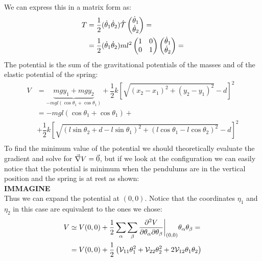 We can express this in a matrix form as:
\begin{equation}
    \begin{split}
        T &= \dfrac{1}{2}(\dot{\theta}_1 \dot{\theta}_2)\hat{\mathcal{T}}\begin{pmatrix}
            \dot{\theta}_1 \\\dot{\theta}_2
        \end{pmatrix} = \\
        &= \dfrac{1}{2}(\dot{\theta}_1 \dot{\theta}_2)ml^2\begin{pmatrix}
            1 & 0\\
            0 & 1
        \end{pmatrix}
        \begin{pmatrix}
            \dot{\theta}_1 \\\dot{\theta}_2
        \end{pmatrix} = \\
    \end{split}
\end{equation}
The potential is the sum of the gravitational potentials of the masses and of the elastic potential of the spring:
\begin{equation}
    \begin{split}
        V &= \underbrace{mgy_1 + mgy_2}_{-mgl(\cos\theta_1+\cos\theta_1)} + \dfrac{1}{2}k\left[\sqrt{(x_2-x_1)^2+(y_2-y_1)^2}-d\right]^2\\
        &= -mgl(\cos\theta_1+\cos\theta_1) +\\
        &+ \dfrac{1}{2}k\left[\sqrt{(l\sin\theta_2+d-l\sin\theta_1)^2+(l\cos\theta_1-l\cos\theta_2)^2}-d\right]^2\\
    \end{split}
\end{equation}
To find the minimum value of the potential we should theoretically evaluate the gradient and solve for $\vec{\nabla} V = \vec{0}$, but if we look at the configuration we can easily notice that the potential is minimum when the pendulums are in the vertical position and the spring is at rest as shown:
\\\textbf{IMMAGINE}\\
Thus we can expand the potential at $(0,0)$. Notice that the coordinates $\eta_1$ and $\eta_2$ in this case are equivalent to the ones we chose:
\begin{equation}
    \begin{split}
        V &\simeq V(0,0) +\dfrac{1}{2}\displaystyle\sum_{\alpha}\displaystyle\sum_{\beta} \dfrac{\partial^2 V}{\partial \theta_{\alpha} \partial \theta_{\beta}}\bigg|_{(0,0)}\theta_{\alpha}\theta_{\beta} = \\
        &= V(0,0) +\dfrac{1}{2}\left(\mathcal{V}_{11}\theta_1^2 + \mathcal{V}_{22}\theta_2^2 + 2\mathcal{V}_{12}\theta_1\theta_2\right)
    \end{split}
\end{equation}
